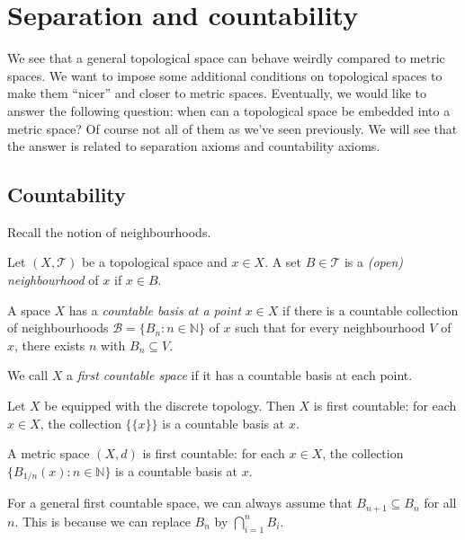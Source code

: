 \section{Separation and countability}

We see that a general topological space can behave weirdly compared to metric spaces. We want to impose some additional conditions on topological spaces to make them ``nicer'' and closer to metric spaces. Eventually, we would like to answer the following question: when can a topological space be embedded into a metric space? Of course not all of them as we've seen previously. We will see that the answer is related to separation axioms and countability axioms.

\subsection{Countability}

Recall the notion of neighbourhoods.
\begin{definition}[Neighbourhood]
Let $(X,\mathcal{T})$ be a topological space and $x\in X$. A set $B\in \mathcal{T}$ is a \emph{(open) neighbourhood} of $x$ if $x\in B$.
\end{definition}

\begin{definition}
    A space $X$ has a \emph{countable basis at a point} $x\in X$ if there is a countable collection of neighbourhoods $\mathcal{B}=\{B_n:n\in\mathbb{N}\}$ of $x$ such that for every neighbourhood $V$ of $x$, there exists $n$ with $B_n\subseteq V$. 
    
    We call $X$ a \emph{first countable space} if it has a countable basis at each point.
\end{definition}


\begin{example}
    Let $X$ be equipped with the discrete topology. Then $X$ is first countable: for each $x\in X$, the collection $\{\{x\}\}$ is a countable basis at $x$.
\end{example}


\begin{example}
    A metric space $(X,d)$ is first countable: for each $x\in X$, the collection $\{B_{1/n}(x):n\in\mathbb{N}\}$ is a countable basis at $x$.
\end{example}

\begin{remark}
    For a general first countable space, we can always assume that $B_{n+1}\subseteq B_n$ for all $n$. This is because we can replace $B_n$ by $\bigcap_{i=1}^n B_i$.
\end{remark}

